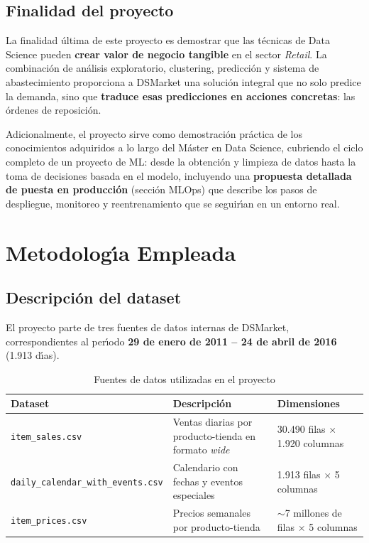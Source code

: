 \documentclass[12pt, a4paper, oneside]{report}
\newcommand{\dataset}[1]{\texttt{\footnotesize\color{codepurple}#1}}
\begin{document}
\section{Finalidad del proyecto}

La finalidad \'ultima de este proyecto es demostrar que las t\'ecnicas de Data Science pueden \textbf{crear valor de negocio tangible} en el sector \textit{Retail}. La combinaci\'on de an\'alisis exploratorio, clustering, predicci\'on y sistema de abastecimiento proporciona a DSMarket una soluci\'on integral que no solo predice la demanda, sino que \textbf{traduce esas predicciones en acciones concretas}: las \'ordenes de reposici\'on.

Adicionalmente, el proyecto sirve como demostraci\'on pr\'actica de los conocimientos adquiridos a lo largo del M\'aster en Data Science, cubriendo el ciclo completo de un proyecto de ML: desde la obtenci\'on y limpieza de datos hasta la toma de decisiones basada en el modelo, incluyendo una \textbf{propuesta detallada de puesta en producci\'on} (secci\'on MLOps) que describe los pasos de despliegue, monitoreo y reentrenamiento que se seguir\'{\i}an en un entorno real.

\chapter{Metodolog\'{\i}a Empleada}

\section{Descripci\'on del dataset}

El proyecto parte de tres fuentes de datos internas de DSMarket, correspondientes al per\'{\i}odo \textbf{29 de enero de 2011 -- 24 de abril de 2016} (1.913 d\'{\i}as).

\begin{table}[H]
  \centering
  \caption{Fuentes de datos utilizadas en el proyecto}
  \label{tab:datasets}
  \begin{tabularx}{\textwidth}{L{3.2cm} L{5.5cm} L{4.5cm}}
    \toprule
    {\color{white}\textbf{Dataset}} &
    {\color{white}\textbf{Descripci\'on}} &
    {\color{white}\textbf{Dimensiones}} \\
    \midrule
    \dataset{item\_sales.csv} &
    Ventas diarias por producto-tienda en formato \textit{wide} &
    30.490 filas $\times$ 1.920 columnas \\
    \dataset{daily\_calendar\_with\_events.csv} &
    Calendario con fechas y eventos especiales &
    1.913 filas $\times$ 5 columnas \\
    \dataset{item\_prices.csv} &
    Precios semanales por producto-tienda &
    $\sim$7 millones de filas $\times$ 5 columnas \\
    \bottomrule
  \end{tabularx}
\end{table}
\end{document}
